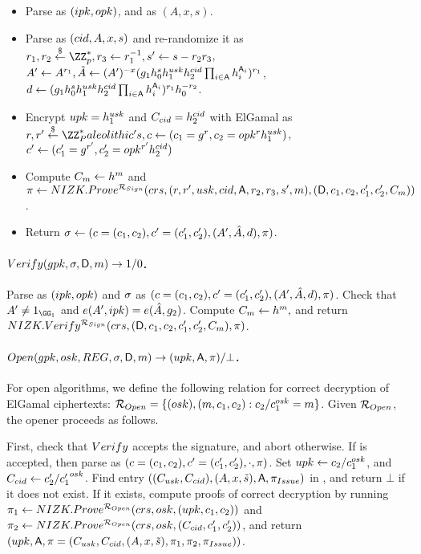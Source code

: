 \begin{itemize}
\item Parse \gpk as $(ipk,opk)$, and \cred as $(A,x,s)$.
\item Parse \cred as $(cid,A,x,s)$ and re-randomize it as $r_1,r_2 \getr
  \ZZ^*_p, r_3 \gets r_1^{-1}, s' \gets s - r_2r_3$, $A' \gets A^{r_1},
  \hat{A} \gets (A')^{-x}(g_1h_0^sh_1^{usk}h_2^{cid}
  \prod_{i \in \mathsf{A}}h_i^{\mathsf{A}_i})^{r_1}$,
  $d \gets (g_1h_0^sh_1^{usk}h_2^{cid}
  \prod_{i \in \mathsf{A}}h_i^{\mathsf{A}_i})^{r_1}h_0^{-r_2}$.
\item Encrypt $upk=h_1^{usk}$ and $C_{cid}=h_2^{cid}$
  with ElGamal as $r,r' \getr \ZZ^*_Paleolithic's,
  c \gets (c_1 = \gen{g}^r,c_2 = \opk^r\gen{h}_1^{\usk})$,
  $c' \gets (c'_1 = g^{r'},c'_2 = opk^{r'}h_2^{cid})$
\item Compute $C_{m} \gets h^m$ and
  $\pi \gets NIZK.Prove^{\mathcal{R}_{Sign}}(crs,
  (r,r',usk,cid,\mathsf{A},r_2,r_3,s',m), (\mathsf{D},c_1,c_2,c'_1,c'_2,C_{m}))$.
\item Return $\sigma \gets (c=(c_1,c_2),c'=(c'_1,c'_2),(A',\hat{A},d),\pi)$.
\end{itemize}

\paragraph{$Verify(gpk,\sigma,\mathsf{D},m) \rightarrow 1/0$.} %
Parse \gpk as $(ipk,opk)$ and $\sigma$ as $(c=(c_1,c_2),c'=(c'_1,c'_2),
(A',\hat{A},d), \pi)$. Check that $A' \neq 1_{\GG_1}$ and $e(A',ipk) =
e(\hat{A},g_2)$. Compute $C_{m} \gets h^m,$ and return
$NIZK.Verify^{\mathcal{R}_{Sign}}(crs,(\mathsf{D},c_1,c_2,c'_1,c'_2,C_{m}),
\pi)$.

\paragraph{$\Open(\gpk,\osk,\trans,\sig,\DAttrs,\msg)
  \rightarrow (\upk,\Attrs,\oproof)/\bot$.} %
For open algorithms, we define the following relation for correct decryption of
ElGamal ciphertexts: $\mathcal{R}_{Open} = \lbrace (osk),(m,c_1,c_2):
c_2/c_1^{osk} = m \rbrace$. Given $\mathcal{R}_{Open}$, the opener proceeds as
follows.

First, check that $Verify$ accepts the signature, and abort otherwise. If \sig
is accepted, then parse \sig as $(c=(c_1,c_2),c'=(c'_1,c'_2),\cdot,\pi)$.
Set $upk \gets c_2/c_1^{osk}$, and $C_{cid} \gets c'_2/{c'_1}^{osk}$. Find
entry $((C_{usk},C_{cid}),(A,x,\tilde{s}),\mathsf{A},\pi_{Issue})$ in \trans,
and return $\bot$ if it does not exist. If it exists, compute proofs of correct
decryption
by running $\pi_1 \gets NIZK.Prove^{\mathcal{R}_{Open}}(crs,osk,
(upk,c_1,c_2))$ and $\pi_2 \gets NIZK.Prove^{\mathcal{R}_{Open}}(crs,
osk,(C_{cid},c'_1,c'_2))$, and return $(upk,\mathsf{A},\pi = (C_{usk},
C_{cid},(A,x,\tilde{s}),\pi_1,\pi_2,\pi_{Issue}))$.

